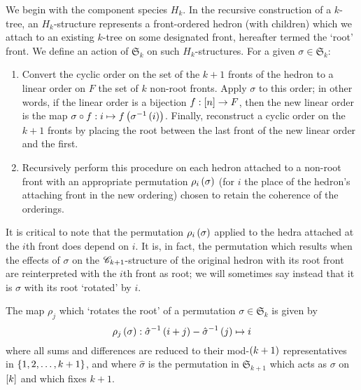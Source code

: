 \documentclass[sectionflow,singlespace,twoside,boldmathhdr]{brandiss} %
\numberwithin{section}{chapter}
\numberwithin{figure}{chapter}
\begin{document}
We begin with the component species $H_{k}$.
In the recursive construction of a $k$-tree, an $H_{k}$-structure represents a front-ordered hedron (with children) which we attach to an existing $k$-tree on some designated front, hereafter termed the `root' front. We define an action of $\mathfrak{S}_{k}$ on such $H_{k}$-structures.
For a given $\sigma \in \mathfrak{S}_{k}$:
\begin{enumerate}
  \item Convert the cyclic order on the set of the $k+1$ fronts of the hedron to a linear order on $F$ the set of $k$ non-root fronts.
    Apply $\sigma$ to this order; in other words, if the linear order is a bijection $f: \left[ {n} \right] \to F$, then the new linear order is the map $\sigma \circ f: i \mapsto f \left( {\sigma^{-1} \left( {i} \right)} \right)$.
    Finally, reconstruct a cyclic order on the $k+1$ fronts by placing the root between the last front of the new linear order and the first.
  \item Recursively perform this procedure on each hedron attached to a non-root front with an appropriate permutation $\rho_{i} \left( {\sigma} \right)$ (for $i$ the place of the hedron's attaching front in the new ordering) chosen to retain the coherence of the orderings.
\end{enumerate}
It is critical to note that the permutation $\rho_{i} \left( {\sigma} \right)$ applied to the hedra attached at the $i$th front does depend on $i$.
It is, in fact, the permutation which results when the effects of $\sigma$ on the $\mathscr{C}_{k+1}$-structure of the original hedron with its root front are reinterpreted with the $i$th front as root; we will sometimes say instead that it is $\sigma$ with its root `rotated' by $i$.

\begin{theorem}
  The map $\rho_{j}$ which `rotates the root' of a permutation $\sigma \in \mathfrak{S}_{k}$ is given by
  \begin{equation}
    \label{eq:rhodef}
    \rho_{j} \left( {\sigma} \right) : \hat{\sigma}^{-1} \left( {i + j} \right) - \hat{\sigma}^{-1} \left( {j} \right) \mapsto i
  \end{equation}
  where all sums and differences are reduced to their mod-$\left( {k+1} \right)$ representatives in $\left\{ {1, 2, \dots, k+1} \right\}$, and where $\hat{\sigma}$ is the permutation in $\mathfrak{S}_{k+1}$ which acts as $\sigma$ on $\left[ {k} \right]$ and which fixes $k+1$.
\end{theorem}
\end{document}
